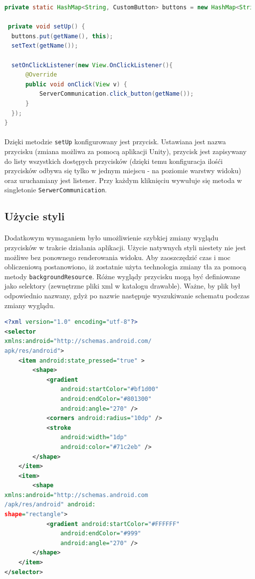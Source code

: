 \begin{lstlisting}[language=Java]
private static HashMap<String, CustomButton> buttons = new HashMap<String, CustomButton>();

 private void setUp() {
  buttons.put(getName(), this);
  setText(getName());

  setOnClickListener(new View.OnClickListener(){
      @Override
      public void onClick(View v) {
          ServerCommunication.click_button(getName());
      }
  });
}
\end{lstlisting}

\paragraph{}
Dzięki metodzie \texttt{setUp} konfigurowany jest przycisk. Ustawiana jest nazwa przycisku (zmiana możliwa za pomocą aplikacji Unity), przycisk jest zapisywany do listy wszystkich dostępych przycisków (dzięki temu konfiguracja ilośći przycisków odbywa się tylko w jednym miejscu - na poziomie warstwy widoku) oraz uruchamiany jest listener. Przy każdym kliknięciu wywułuje się metoda w singletonie \texttt{SerwerCommunication}.


\subsection{Użycie styli}
\paragraph{}
Dodatkowym wymaganiem było umożliwienie szybkiej zmiany wyglądu przycisków w trakcie działania aplikacji. Użycie natywnych styli niestety nie jest możliwe bez ponownego renderowania widoku. Aby zaoszczędzić czas i moc obliczeniową postanowiono, iż zostatnie użyta technologia zmiany tła za pomocą metody \texttt{backgroundResource}. Różne wyglądy przycisku mogą być definiowane jako selektory (zewnętrzne pliki xml w katalogu drawable). Ważne, by plik był odpowiednio nazwany, gdyż po nazwie następuje wyszukiwanie schematu podczas zmiany wyglądu.

\begin{lstlisting}[language=Xml]
<?xml version="1.0" encoding="utf-8"?>
<selector 
xmlns:android="http://schemas.android.com/
apk/res/android">
    <item android:state_pressed="true" >
        <shape>
            <gradient
                android:startColor="#bf1d00"
                android:endColor="#801300"
                android:angle="270" />
            <corners android:radius="10dp" />
            <stroke
                android:width="1dp"
                android:color="#71c2eb" />
        </shape>
    </item>
    <item>
        <shape 
xmlns:android="http://schemas.android.com
/apk/res/android" android:
shape="rectangle">
            <gradient android:startColor="#FFFFFF"
                android:endColor="#999"
                android:angle="270" />
        </shape>
    </item>
</selector>
\end{lstlisting}
